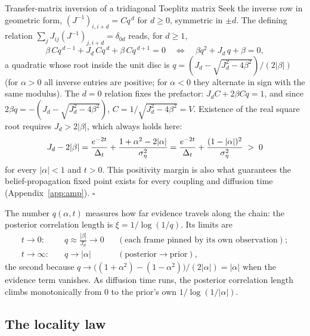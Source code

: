 \begin{toolbox}{Transfer-matrix inversion of a tridiagonal Toeplitz matrix}
Seek the inverse row in geometric form,
$(J^{-1})_{i, i+d} = C q^{\,d}$ for $d \geq 0$, symmetric in $\pm d$. The
defining relation $\sum_j J_{ij} (J^{-1})_{j, i+d} = \delta_{0d}$ reads,
for $d \geq 1$,
\begin{equation*}
  \beta\, C q^{\,d-1} + J_d\, C q^{\,d} + \beta\, C q^{\,d+1} = 0
  \quad\Longleftrightarrow\quad
  \beta q^2 + J_d\, q + \beta = 0,
\end{equation*}
a quadratic whose root inside the unit disc is
$q = (J_d - \sqrt{J_d^2 - 4\beta^2})/(2|\beta|)$ (for $\alpha > 0$ all
inverse entries are positive; for $\alpha < 0$ they alternate in sign with
the same modulus). The $d = 0$ relation fixes the prefactor:
$J_d C + 2\beta C q = 1$, and since
$2\beta q = -(J_d - \sqrt{J_d^2 - 4\beta^2})$,
$C = 1/\sqrt{J_d^2 - 4\beta^2} = V$. Existence of the real square root
requires $J_d > 2|\beta|$, which always holds here:
\begin{equation*}
  J_d - 2|\beta|
  = \frac{e^{-2t}}{\Delta_t} + \frac{1 + \alpha^2 - 2|\alpha|}{\sigma_\eta^2}
  = \frac{e^{-2t}}{\Delta_t} + \frac{(1 - |\alpha|)^2}{\sigma_\eta^2}
  \;>\; 0
\end{equation*}
for every $|\alpha| < 1$ and $t > 0$. This positivity margin is also what
guarantees the belief-propagation fixed point exists for every coupling
and diffusion time (Appendix~\ref{app:amp}). \hfill$\square$
\end{toolbox}

The number $q(\alpha, t)$ measures how far evidence travels along the
chain: the posterior correlation length is $\xi = 1/\log(1/q)$. Its limits
are
\begin{equation}
  \begin{aligned}
  t \to 0:&\quad q \approx \frac{|\beta|}{J_d} \to 0
  &&(\text{each frame pinned by its own observation});\\
  t \to \infty:&\quad q \to |\alpha|
  &&(\text{posterior} \to \text{prior}),
  \end{aligned}
  \label{eq:g-q-limits}
\end{equation}
the second because
$q \to \big((1+\alpha^2) - (1-\alpha^2)\big)/(2|\alpha|) = |\alpha|$ when
the evidence term vanishes. As diffusion time runs, the posterior
correlation length climbs monotonically from $0$ to the prior's own
$1/\log(1/|\alpha|)$.

\subsection{The locality law}

